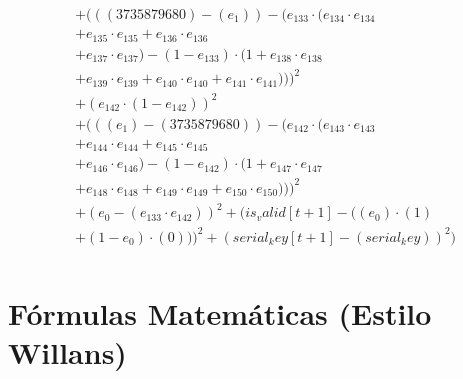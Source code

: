 \documentclass[10pt, a4paper]{article}
\begin{document}
\begin{small}
\begin{align*}
& + (((3735879680) - (e_{1})) - (e_{133} \cdot (e_{134} \cdot e_{134} \\
& + e_{135} \cdot e_{135} + e_{136} \cdot e_{136} \\
& + e_{137} \cdot e_{137}) - (1 - e_{133}) \cdot (1 + e_{138} \cdot e_{138} \\
& + e_{139} \cdot e_{139} + e_{140} \cdot e_{140} + e_{141} \cdot e_{141})))^{2} \\
& + (e_{142} \cdot (1 - e_{142}))^{2} \\
& + (((e_{1}) - (3735879680)) - (e_{142} \cdot (e_{143} \cdot e_{143} \\
& + e_{144} \cdot e_{144} + e_{145} \cdot e_{145} \\
& + e_{146} \cdot e_{146}) - (1 - e_{142}) \cdot (1 + e_{147} \cdot e_{147} \\
& + e_{148} \cdot e_{148} + e_{149} \cdot e_{149} + e_{150} \cdot e_{150})))^{2} \\
& + (e_{0} - (e_{133} \cdot e_{142}))^{2} + (is_valid[t+1] - ((e_{0})  \cdot  (1) \\
& + (1 - e_{0})  \cdot  (0)))^{2} + (serial_key[t+1] - (serial_key))^{2}) \\
\end{align*}
\end{small}\part{Fórmulas Matemáticas (Estilo Willans)}
\end{document}
